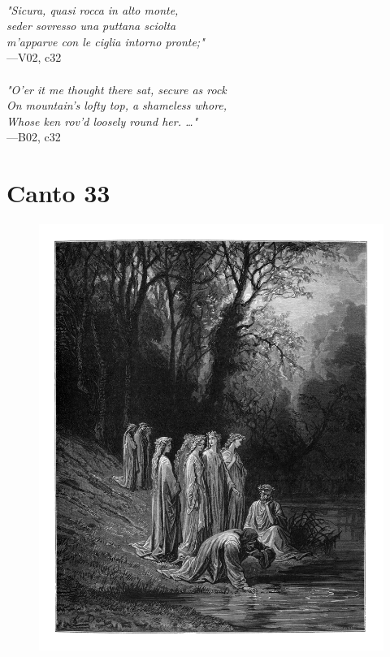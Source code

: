 \documentclass[../Dore_vision.tex]{subfiles}
\begin{document}
\begin{center}
\begin{minipage}{0.8\linewidth}
\textit{\\
"Sicura, quasi rocca in alto monte,\\seder sovresso una puttana sciolta\\m’apparve con le ciglia intorno pronte;"} \\
—V02, c32 \\~\\
\textit{"O'er it me thought there sat, secure as rock\\On mountain's lofty top, a shameless whore,\\Whose ken rov'd loosely round her. …"} \\
—B02, c32
\end{minipage}
\end{center}

\newpage

\section{Canto 33}

\begin{figure}[ht]
\centering
\includegraphics[height=\figsize]{illustrations/book_2/V02, c33.jpg}
\end{figure}
\end{document}
